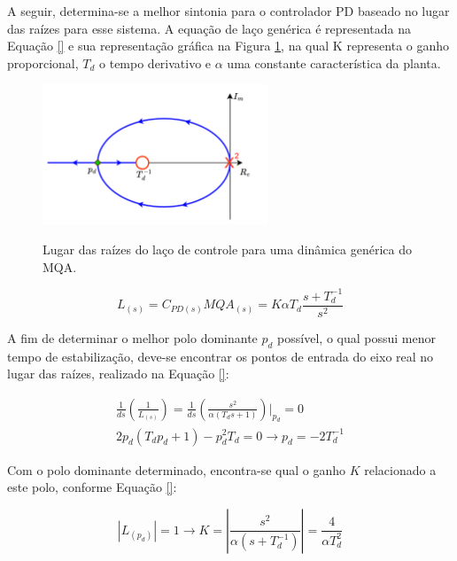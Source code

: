 \documentclass[main.tex]{subfiles}
\begin{document}
\textcolor{att}{
A seguir, determina-se a melhor sintonia para o controlador PD baseado no lugar das raízes para esse sistema. A equação de laço genérica é representada na Equação \ref{} e sua representação gráfica na Figura \ref{fig:lugar_raizes}, na qual K representa o ganho proporcional, $T_d$ o tempo derivativo e $\alpha$ uma constante característica da planta.
}

\begin{figure}[!h]
    \centering
    \caption{Lugar das raízes do laço de controle para uma dinâmica genérica do MQA.}
    \includegraphics[width=0.6\textwidth]{capitulos/controle_atitude/imgs/rlocus.png}
    \label{fig:lugar_raizes}
\end{figure}

\textcolor{att}{
\begin{equation}
    L_{(s)} = C_{PD(s)}MQA_{(s)} = K\alpha T_d\frac{s + T_d^{-1}}{s^2}
\end{equation}
}

\textcolor{att}{
A fim de determinar o melhor polo dominante $p_d$ possível, o qual possui menor tempo de estabilização, deve-se encontrar os pontos de entrada do eixo real no lugar das raízes, realizado na Equação \ref{}:
}

\begin{equation}
    \begin{gathered}
        \frac{1}{ds}\left(\frac{1}{L_{(s)}}\right) = \frac{1}{ds}\left(\frac{s^2}{\alpha(T_ds + 1)}\right)\bigg|_{p_d} = 0\\
        2p_d(T_dp_d + 1) - p_d^2T_d = 0 \longrightarrow p_d = -2T_d^{-1}
    \end{gathered}
\end{equation}

\textcolor{att}{
Com o polo dominante determinado, encontra-se qual o ganho $K$ relacionado a este polo, conforme Equação \ref{}:
}

\begin{equation}
    |L_{(p_d)}| = 1 \longrightarrow K = \left|\frac{s^2}{\alpha(s + T_d^{-1})}\right| = \frac{4}{\alpha T_d^2}
\end{equation}
\end{document}
